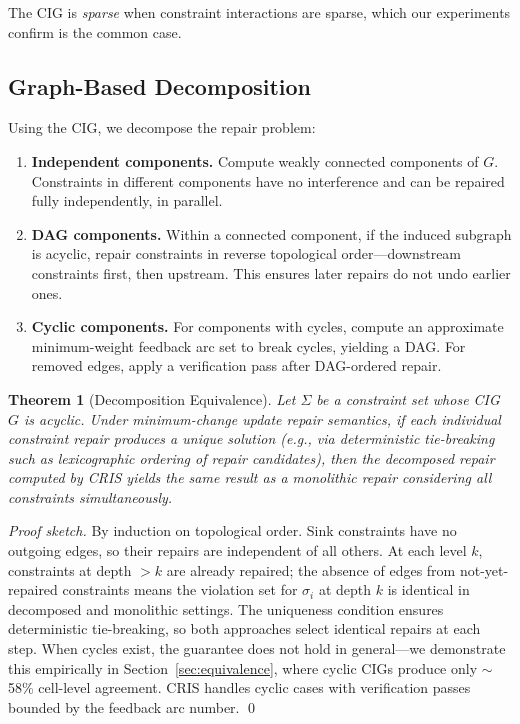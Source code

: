 \documentclass{article}
\newtheorem{theorem}{Theorem}
\newcommand{\cris}{\textsc{CRIS}\xspace}
\begin{document}
The CIG is \emph{sparse} when constraint interactions are sparse, which our experiments confirm is the common case.

\subsection{Graph-Based Decomposition}
\label{sec:decomp}

Using the CIG, we decompose the repair problem:

\begin{enumerate}
  \item \textbf{Independent components.} Compute weakly connected components of $G$. Constraints in different components have no interference and can be repaired fully independently, in parallel.
  \item \textbf{DAG components.} Within a connected component, if the induced subgraph is acyclic, repair constraints in reverse topological order---downstream constraints first, then upstream. This ensures later repairs do not undo earlier ones.
  \item \textbf{Cyclic components.} For components with cycles, compute an approximate minimum-weight feedback arc set to break cycles, yielding a DAG. For removed edges, apply a verification pass after DAG-ordered repair.
\end{enumerate}

\begin{theorem}[Decomposition Equivalence]
\label{thm:equiv}
Let $\Sigma$ be a constraint set whose CIG $G$ is acyclic. Under minimum-change update repair semantics, if each individual constraint repair produces a unique solution (e.g., via deterministic tie-breaking such as lexicographic ordering of repair candidates), then the decomposed repair computed by \cris yields the same result as a monolithic repair considering all constraints simultaneously.
\end{theorem}

\emph{Proof sketch.} By induction on topological order. Sink constraints have no outgoing edges, so their repairs are independent of all others. At each level $k$, constraints at depth $>k$ are already repaired; the absence of edges from not-yet-repaired constraints means the violation set for $\sigma_i$ at depth $k$ is identical in decomposed and monolithic settings. The uniqueness condition ensures deterministic tie-breaking, so both approaches select identical repairs at each step. When cycles exist, the guarantee does not hold in general---we demonstrate this empirically in Section~\ref{sec:equivalence}, where cyclic CIGs produce only $\sim$58\% cell-level agreement. \cris handles cyclic cases with verification passes bounded by the feedback arc number. \qed
\end{document}
